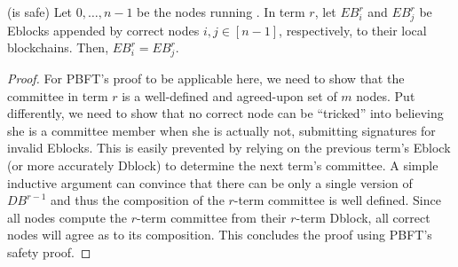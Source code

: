 \begin{claim}{(\name is safe)}
Let $0,\dots,n-1$ be the nodes running \nameNS. In term $r$, let $EB^r_i$ and $EB^r_j$ be Eblocks appended by correct nodes $i,j\in [n-1]$, respectively, to their local blockchains. Then, $EB^r_i=EB^r_j$.
\end{claim}
\begin{proof}
For PBFT's proof to be applicable here, we need to show that the committee in term $r$ is a well-defined and agreed-upon set of $m$ nodes. Put differently, we need to show that no correct node can be ``tricked'' into believing she is a committee member when she is actually not, submitting signatures for invalid Eblocks. This is easily prevented by relying on the previous term's Eblock (or more accurately Dblock) to determine the next term's committee. A simple inductive argument can convince that there can be only a single version of $DB^{r-1}$ and thus the composition of the $r$-term committee is well defined. Since all nodes compute the $r$-term committee from their $r$-term Dblock, all correct nodes will agree as to its composition. This concludes the proof using PBFT's safety proof. 
\end{proof}


